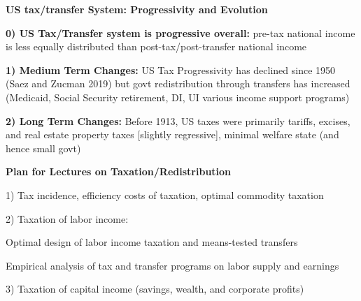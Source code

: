 \documentclass[landscape]{slides}
\begin{document}
%


\begin{slide}
\begin{center}
{\bf US tax/transfer System: Progressivity and Evolution}
\end{center}
{\bf 0) US Tax/Transfer system is progressive overall:} pre-tax national income is less
equally distributed than post-tax/post-transfer national income 

{\bf 1) Medium Term Changes:} US Tax Progressivity has declined
since 1950 (Saez and Zucman 2019) but govt redistribution through transfers has increased (Medicaid, Social Security retirement, DI, UI
various income support programs)

{\bf 2) Long Term Changes:} Before 1913, US taxes were primarily
tariffs, excises, and real estate property taxes [slightly
regressive], minimal welfare state (and hence small govt)

\end{slide}

%


\begin{slide}

\end{slide}



\begin{slide}
\begin{center}
{\bf Plan for Lectures on Taxation/Redistribution}
\end{center}

1) Tax incidence, efficiency costs of taxation, optimal commodity taxation

2) Taxation of labor income:

Optimal design of labor income taxation and means-tested transfers

Empirical analysis of tax and transfer programs on labor supply and earnings

3) Taxation of capital income (savings, wealth, and corporate profits)



\end{slide}
\end{document}
